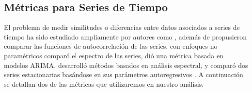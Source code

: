 \documentclass[12pt,oneside]{book}\usepackage[]{graphicx}\usepackage[]{color}
\theoremstyle{definition} %
\begin{document}
\subsection{Métricas para Series de Tiempo}
\label{sec:metrica}
El problema de medir similitudes o diferencias entre datos asociados a series de tiempo ha sido estudiado ampliamente por autores como \citeauthor{johnson2004multivariate} \citeyear{johnson2004multivariate}, además de \citeauthor{galeano2000multivariate} \citeyear{galeano2000multivariate} propusieron comparar las funciones de autocorrelación de las series, \citeauthor{diggle1991nonparametric} \citeyear{diggle1991nonparametric} con enfoques no paramétricos comparó el espectro de las series,  \citeauthor{piccolo1990distance} \citeyear{piccolo1990distance} dió una métrica basada en modelos ARIMA, \citeauthor{diggle1997spectral} \citeyear{diggle1997spectral} desarrolló métodos basados en análisis espectral, y \citeauthor{maharaj2000cluster} \citeyear{maharaj2000cluster} comparó dos series estacionarias basándose en sus parámetros autoregresivos . A continuación se detallan dos de las métricas que utilizaremos en nuestro análisis.
\end{document}
